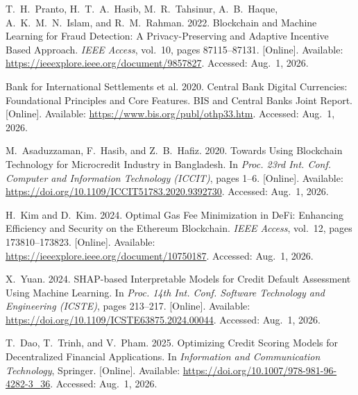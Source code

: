 {\begin{enumerate}[label={[\arabic*]}]
\item T.~H.~Pranto, H.~T.~A.~Hasib, M.~R.~Tahsinur, A.~B.~Haque, A.~K.~M.~N.~Islam, and R.~M.~Rahman. 2022. Blockchain and Machine Learning for Fraud Detection: A Privacy-Preserving and Adaptive Incentive Based Approach. \emph{IEEE Access}, vol.~10, pages 87115--87131. [Online]. Available: \url{https://ieeexplore.ieee.org/document/9857827}. Accessed: Aug.~1, 2026.

\item Bank for International Settlements et al. 2020. Central Bank Digital Currencies: Foundational Principles and Core Features. BIS and Central Banks Joint Report. [Online]. Available: \url{https://www.bis.org/publ/othp33.htm}. Accessed: Aug.~1, 2026.

\item M.~Asaduzzaman, F.~Hasib, and Z.~B.~Hafiz. 2020. Towards Using Blockchain Technology for Microcredit Industry in Bangladesh. In \emph{Proc. 23rd Int. Conf. Computer and Information Technology (ICCIT)}, pages 1--6. [Online]. Available: \url{https://doi.org/10.1109/ICCIT51783.2020.9392730}. Accessed: Aug.~1, 2026.

\item H.~Kim and D.~Kim. 2024. Optimal Gas Fee Minimization in DeFi: Enhancing Efficiency and Security on the Ethereum Blockchain. \emph{IEEE Access}, vol.~12, pages 173810--173823. [Online]. Available: \url{https://ieeexplore.ieee.org/document/10750187}. Accessed: Aug.~1, 2026.

\item X.~Yuan. 2024. SHAP-based Interpretable Models for Credit Default Assessment Using Machine Learning. In \emph{Proc. 14th Int. Conf. Software Technology and Engineering (ICSTE)}, pages 213--217. [Online]. Available: \url{https://doi.org/10.1109/ICSTE63875.2024.00044}. Accessed: Aug.~1, 2026.

\item T.~Dao, T.~Trinh, and V.~Pham. 2025. Optimizing Credit Scoring Models for Decentralized Financial Applications. In \emph{Information and Communication Technology}, Springer. [Online]. Available: \url{https://doi.org/10.1007/978-981-96-4282-3_36}. Accessed: Aug.~1, 2026.




\end{enumerate}}
